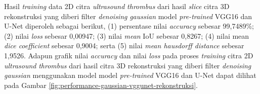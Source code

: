 \begin{enumerate}
	Hasil \textit{training} data 2D citra \textit{ultrasound} \textit{thrombus} dari hasil \textit{slice} citra 3D rekonstruksi yang diberi filter \textit{denoising} \textit{gaussian} model \textit{pre-trained} VGG16 dan U-Net diperoleh sebagai berikut, (1) persentase nilai \textit{accuracy} sebesar 99,7489\%; (2) nilai \textit{loss} sebesar 0,00947; (3) nilai \textit{mean} IoU sebesar 0,8267; (4) nilai mean \textit{dice coefficient} sebesar 0,9004; serta (5) nilai \textit{mean hausdorff distance} sebesar 1,9526. Adapun grafik nilai \textit{accuracy} dan nilai \textit{loss} pada proses \textit{training} citra 2D \textit{ultrasound} \textit{thrombus} dari hasil citra 3D rekonstruksi yang diberi filter \textit{denoising} \textit{gaussian} menggunakan model model \textit{pre-trained} VGG16 dan U-Net dapat dilihat pada Gambar \ref{fig:performance-gaussian-vggunet-rekonstruksi}.
	

\end{enumerate}
